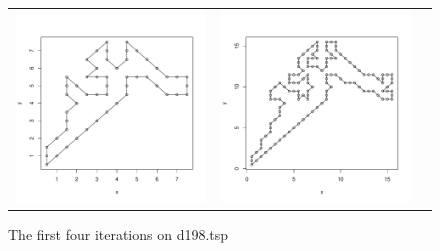 \begin{figure}[t]
\begin{center}
\begin{tabular}{ccc}
\includegraphics[scale=0.25]{fig/it8.pdf} &
\includegraphics[scale=0.25]{fig/it16.pdf}
\end{tabular}
\caption{The first four iterations on d198.tsp}
\label{fig:iterations}
\end{center}
\end{figure}




